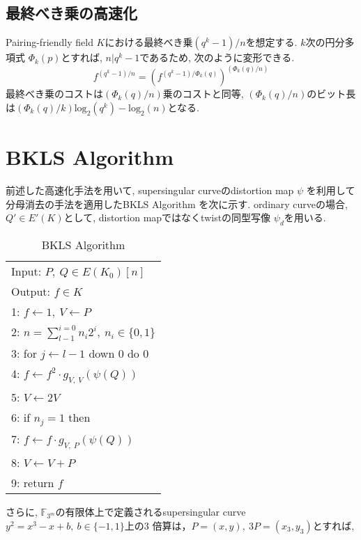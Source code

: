 \subsection{最終べき乗の高速化}
Pairing-friendly field $K$における最終べき乗$(q^k - 1) / n$を想定する. $k$次の円分多項式 $\Phi _k(p)$とすれば, $n|q^k - 1$であるため, 次のように変形できる. 
\[
f^{(q^k - 1) / n} = (f^{(q^k - 1) / \Phi _k(q)})^{(\Phi _k(q) / n)}
\] 
最終べき乗のコストは$(\Phi _k(q) / n)$乗のコストと同等, $(\Phi _k(q) / n)$のビット長は$(\Phi _k(q) / k)\mbox{log} _2 (q^k) - \mbox{log} _2 (n)$となる.
\clearpage
\section{BKLS Algorithm}
前述した高速化手法を用いて, supersingular curveのdistortion map $\psi$ を利用して分母消去の手法を適用したBKLS Algorithm \cite{BKLS02}を次に示す. ordinary curveの場合, $Q' \in E'(K)$として, distortion mapではなくtwistの同型写像 $\psi _d$を用いる. 
\vspace{-0.5cm}
\par
\begin{table}[htbp]
 \begin{center}
  \begin{tabular}{|l|}
     \hline
     Input: $P,\ Q \in E(K_0)[n]$\\
     Output: $f \in K$\\
     \hline
     1: \quad $f \gets 1,\ V \gets P$\\
     2: \quad $n=\sum_{l-1}^{i=0} n_i 2^i, \ n_i \in \{0,1\}$\\
     3: \quad for $j \gets l-1$ down 0 do 0\\
     4: \quad \quad $f \gets f^2 \cdot g_{V,\ V}(\psi (Q))$\\
     5: \quad \quad $V \gets 2V$\\
     6: \quad if $n_j = 1$ then\\
     7: \quad \quad $f \gets f \cdot g_{V,\ P}(\psi (Q))$\\
     8: \quad \quad $V \gets V+P$\\
     9: \quad return $f$\\
     \hline
   \end{tabular}
 \end{center}
 \caption{BKLS Algorithm}
\end{table}
\vspace{-0.5cm}
\par
さらに, $\mathbb{F}_{3^m}$の有限体上で定義されるsupersingular curve $y^2 = x^3 - x + b,\ b \in \{-1,1\} $上の3 倍算は，$P = (x, y),\ 3P = (x_3, y_3) $とすれば, 
